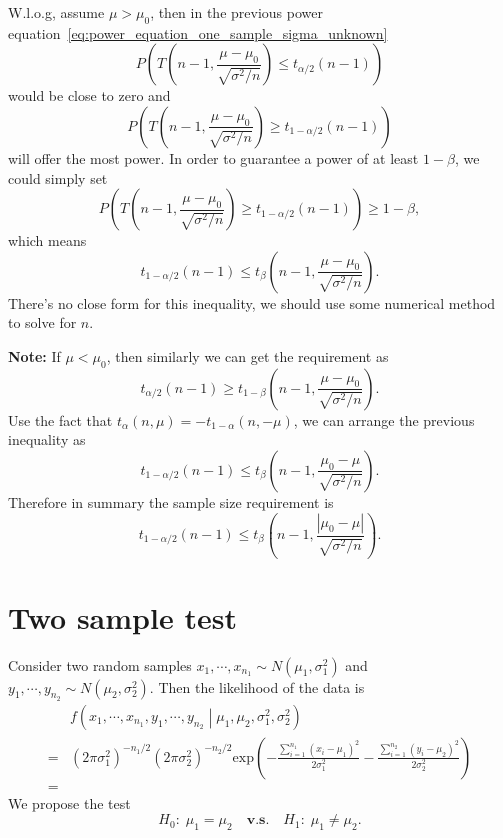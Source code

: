 \documentclass[a4paper,12pt]{article}
\begin{document}
W.l.o.g, assume $\mu > \mu_0$, then in the previous power equation~\eqref{eq:power_equation_one_sample_sigma_unknown}
\[
  P\left(
    T\left(n - 1,  \frac{\mu - \mu_0}{\sqrt{\sigma^2 / n}}\right)
    \leq t_{\alpha / 2}\left(n - 1\right)
  \right)
\]
would be close to zero and
\[
  P\left(
    T\left(n - 1,  \frac{\mu - \mu_0}{\sqrt{\sigma^2 / n}}\right)
    \geq t_{1 - \alpha / 2}\left(n - 1\right)
  \right)
\]
will offer the most power. In order to guarantee a power of at least $1 - \beta$, we could simply set
\[
  P\left(
    T\left(n - 1,  \frac{\mu - \mu_0}{\sqrt{\sigma^2 / n}}\right)
    \geq t_{1 - \alpha / 2}\left(n - 1\right)
  \right)
  \geq 1 - \beta
  , 
\]
which means
\[
  t_{1 - \alpha / 2}\left(n - 1\right)
  \leq t_{\beta}\left(n - 1, \frac{\mu - \mu_0}{\sqrt{\sigma^2 / n}}\right)
  .
\]
There's no close form for this inequality, we should use some numerical method to solve for $n$.
\par
\textbf{Note: } If $\mu < \mu_0$, then similarly we can get the requirement as
\[
  t_{\alpha / 2}\left(n - 1\right) \geq t_{1 - \beta}\left(n - 1, \frac{\mu - \mu_0}{\sqrt{\sigma^2 / n}}\right)
  .
\]
Use the fact that $t_{\alpha}\left(n, \mu\right) = -t_{1 - \alpha}\left(n, -\mu\right)$, we can arrange the previous inequality as
\[
  t_{1 - \alpha / 2}\left(n - 1\right)
  \leq
  t_{\beta}\left(n - 1, \frac{\mu_0 - \mu}{\sqrt{\sigma^2 / n}}\right)
  .
\]
Therefore in summary the sample size requirement is
\[
  t_{1 - \alpha / 2}\left(n - 1\right)
  \leq
  t_{\beta}\left(n - 1, \frac{\left|\mu_0 - \mu\right|}{\sqrt{\sigma^2 / n}}\right)
  .
\]

\section{Two sample test}
\label{sec:two-sample-test}

Consider two random samples $x_1, \cdots, x_{n_1} \sim N\left(\mu_1, \sigma_1^2\right)$ and $y_1, \cdots, y_{n_2}\sim N\left(\mu_2, \sigma_2^2\right)$. Then the likelihood of the data is
\[
  \begin{aligned}
    & f\left(x_1, \cdots, x_{n_1}, y_1, \cdots, y_{n_2}
      \middle|\mu_1, \mu_2, \sigma_1^2, \sigma_2^2\right)    \\
    =& \left( 2\pi\sigma_1^2\right)^{-n_1 / 2}
    \left(2\pi\sigma_2^2\right)^{-n_2 / 2}
    \mathrm{exp}\left(
      - \frac{\sum\limits_{i = 1}^{n_1}\left(x_i - \mu_1\right)^2}{2\sigma_1^2}
      - \frac{\sum\limits_{i = 1}^{n_2}\left(y_i - \mu_2\right)^2}{2\sigma_2^2}
    \right)    \\
    =& 
  \end{aligned}
\]
We propose the test
\[
  H_0:\; \mu_1 = \mu_2
  \quad\textbf{v.s.}\quad
  H_1:\; \mu_1 \neq \mu_2
  .
\]
\end{document}
